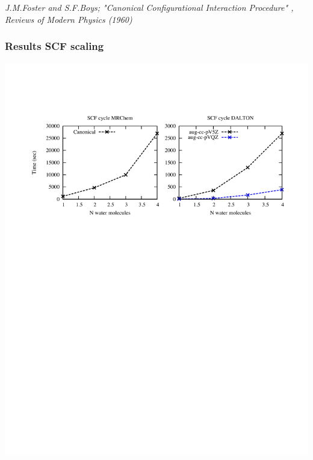 \documentclass[mathserif]{beamer}
\begin{document}
\begin{frame}
\begin{columns}
\begin{column}{.48\textwidth}
\begin{center}
	\end{center}
    \end{column}
    \end{columns}
    \ \\
    \ \\
    \tiny \it{J.M.Foster and S.F.Boys; "Canonical Configurational Interaction Procedure" 
	    , Reviews of Modern Physics (1960)}
\end{frame}

\begin{frame}
    \frametitle{Results SCF scaling}
    \begin{center}
    \includegraphics[bb = 50 480 600 700, clip, scale=0.6]{figures/SCFscaling_1.pdf}
    \end{center}
\end{frame}
\end{document}
